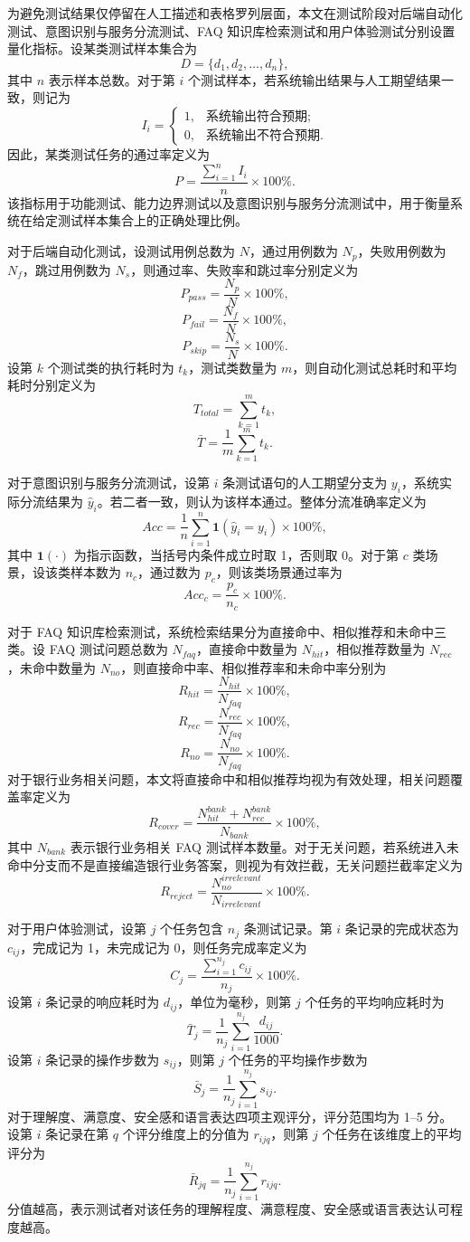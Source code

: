 \documentclass[bachelor, print]{xduthesis}
\begin{document}
为避免测试结果仅停留在人工描述和表格罗列层面，本文在测试阶段对后端自动化测试、意图识别与服务分流测试、FAQ 知识库检索测试和用户体验测试分别设置量化指标。设某类测试样本集合为
\[
D=\{d_1,d_2,\ldots,d_n\},
\]
其中 \(n\) 表示样本总数。对于第 \(i\) 个测试样本，若系统输出结果与人工期望结果一致，则记为
\[
I_i=
\begin{cases}
1, & \text{系统输出符合预期};\\
0, & \text{系统输出不符合预期}.
\end{cases}
\]
因此，某类测试任务的通过率定义为
\[
P=\frac{\sum_{i=1}^{n} I_i}{n}\times 100\%.
\]
该指标用于功能测试、能力边界测试以及意图识别与服务分流测试中，用于衡量系统在给定测试样本集合上的正确处理比例。

对于后端自动化测试，设测试用例总数为 \(N\)，通过用例数为 \(N_p\)，失败用例数为 \(N_f\)，跳过用例数为 \(N_s\)，则通过率、失败率和跳过率分别定义为
\[
P_{pass}=\frac{N_p}{N}\times 100\%,
\]
\[
P_{fail}=\frac{N_f}{N}\times 100\%,
\]
\[
P_{skip}=\frac{N_s}{N}\times 100\%.
\]
设第 \(k\) 个测试类的执行耗时为 \(t_k\)，测试类数量为 \(m\)，则自动化测试总耗时和平均耗时分别定义为
\[
T_{total}=\sum_{k=1}^{m}t_k,
\]
\[
\bar{T}=\frac{1}{m}\sum_{k=1}^{m}t_k.
\]

对于意图识别与服务分流测试，设第 \(i\) 条测试语句的人工期望分支为 \(y_i\)，系统实际分流结果为 \(\hat{y}_i\)。若二者一致，则认为该样本通过。整体分流准确率定义为
\[
Acc=\frac{1}{n}\sum_{i=1}^{n}\mathbf{1}(\hat{y}_i=y_i)\times 100\%,
\]
其中 \(\mathbf{1}(\cdot)\) 为指示函数，当括号内条件成立时取 1，否则取 0。对于第 \(c\) 类场景，设该类样本数为 \(n_c\)，通过数为 \(p_c\)，则该类场景通过率为
\[
Acc_c=\frac{p_c}{n_c}\times 100\%.
\]

对于 FAQ 知识库检索测试，系统检索结果分为直接命中、相似推荐和未命中三类。设 FAQ 测试问题总数为 \(N_{faq}\)，直接命中数量为 \(N_{hit}\)，相似推荐数量为 \(N_{rec}\)，未命中数量为 \(N_{no}\)，则直接命中率、相似推荐率和未命中率分别为
\[
R_{hit}=\frac{N_{hit}}{N_{faq}}\times 100\%,
\]
\[
R_{rec}=\frac{N_{rec}}{N_{faq}}\times 100\%,
\]
\[
R_{no}=\frac{N_{no}}{N_{faq}}\times 100\%.
\]
对于银行业务相关问题，本文将直接命中和相似推荐均视为有效处理，相关问题覆盖率定义为
\[
R_{cover}=\frac{N_{hit}^{bank}+N_{rec}^{bank}}{N_{bank}}\times 100\%,
\]
其中 \(N_{bank}\) 表示银行业务相关 FAQ 测试样本数量。对于无关问题，若系统进入未命中分支而不是直接编造银行业务答案，则视为有效拦截，无关问题拦截率定义为
\[
R_{reject}=\frac{N_{no}^{irrelevant}}{N_{irrelevant}}\times 100\%.
\]

对于用户体验测试，设第 \(j\) 个任务包含 \(n_j\) 条测试记录。第 \(i\) 条记录的完成状态为 \(c_{ij}\)，完成记为 1，未完成记为 0，则任务完成率定义为
\[
C_j=\frac{\sum_{i=1}^{n_j}c_{ij}}{n_j}\times 100\%.
\]
设第 \(i\) 条记录的响应耗时为 \(d_{ij}\)，单位为毫秒，则第 \(j\) 个任务的平均响应耗时为
\[
\bar{T}_j=\frac{1}{n_j}\sum_{i=1}^{n_j}\frac{d_{ij}}{1000}.
\]
设第 \(i\) 条记录的操作步数为 \(s_{ij}\)，则第 \(j\) 个任务的平均操作步数为
\[
\bar{S}_j=\frac{1}{n_j}\sum_{i=1}^{n_j}s_{ij}.
\]
对于理解度、满意度、安全感和语言表达四项主观评分，评分范围均为 1--5 分。设第 \(i\) 条记录在第 \(q\) 个评分维度上的分值为 \(r_{ijq}\)，则第 \(j\) 个任务在该维度上的平均评分为
\[
\bar{R}_{jq}=\frac{1}{n_j}\sum_{i=1}^{n_j}r_{ijq}.
\]
分值越高，表示测试者对该任务的理解程度、满意程度、安全感或语言表达认可程度越高。
\end{document}
